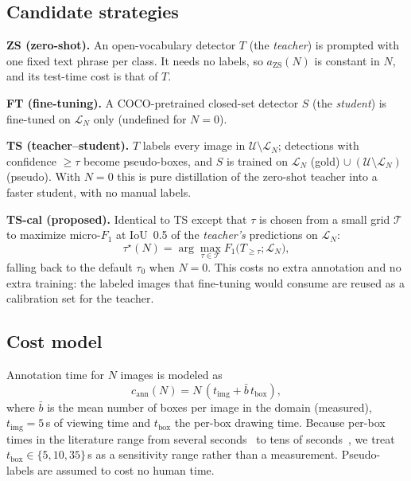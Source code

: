 \documentclass[conference]{IEEEtran}
\begin{document}
\subsection{Candidate strategies}
\textbf{ZS (zero-shot).} An open-vocabulary detector $T$ (the \emph{teacher}) is prompted with one fixed text phrase per class. It needs no labels, so $a_{\text{ZS}}(N)$ is constant in $N$, and its test-time cost is that of $T$.

\textbf{FT (fine-tuning).} A COCO-pretrained closed-set detector $S$ (the \emph{student}) is fine-tuned on $\mathcal{L}_N$ only (undefined for $N=0$).

\textbf{TS (teacher--student).} $T$ labels every image in $\mathcal{U}\setminus\mathcal{L}_N$; detections with confidence $\ge\tau$ become pseudo-boxes, and $S$ is trained on $\mathcal{L}_N$ (gold) $\cup\ (\mathcal{U}\setminus\mathcal{L}_N)$ (pseudo). With $N=0$ this is pure distillation of the zero-shot teacher into a faster student, with no manual labels.

\textbf{TS-cal (proposed).} Identical to TS except that $\tau$ is chosen from a small grid $\mathcal{T}$ to maximize micro-$F_1$ at IoU~0.5 of the \emph{teacher's} predictions on $\mathcal{L}_N$:
\begin{equation}
\tau^\star(N)=\arg\max_{\tau\in\mathcal{T}} F_1\big(T_{\ge\tau};\mathcal{L}_N\big),
\end{equation}
falling back to the default $\tau_0$ when $N=0$. This costs no extra annotation and no extra training: the labeled images that fine-tuning would consume are reused as a calibration set for the teacher.

\subsection{Cost model}
Annotation time for $N$ images is modeled as
\begin{equation}
c_{\text{ann}}(N)=N\,(t_{\text{img}}+\bar b\,t_{\text{box}}),
\end{equation}
where $\bar b$ is the mean number of boxes per image in the domain (measured), $t_{\text{img}}=5$\,s of viewing time and $t_{\text{box}}$ the per-box drawing time. Because per-box times in the literature range from several seconds~\cite{papadopoulos2017extreme} to tens of seconds~\cite{su2012crowdsourcing}, we treat $t_{\text{box}}\in\{5,10,35\}$\,s as a sensitivity range rather than a measurement. Pseudo-labels are assumed to cost no human time.
\end{document}
